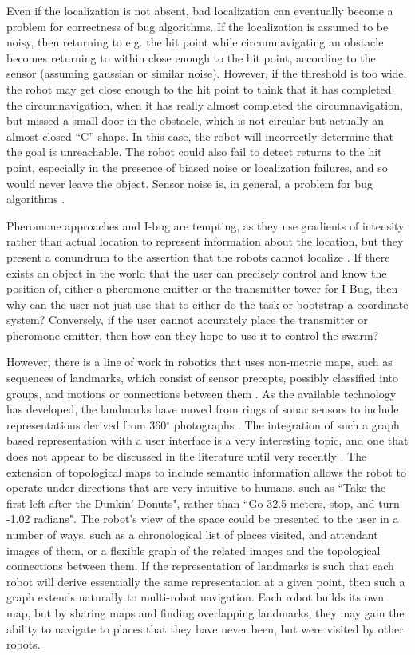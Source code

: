 Even if the localization is not absent, bad localization can eventually become a problem for correctness of bug algorithms. 
If the localization is assumed to be noisy, then returning to e.g. the hit point while circumnavigating an obstacle becomes returning to within close enough to the hit point, according to the sensor (assuming gaussian or similar noise). 
However, if the threshold is too wide, the robot may get close enough to the hit point to think that it has completed the circumnavigation, when it has really almost completed the circumnavigation, but missed a small door in the obstacle, which is not circular but actually an almost-closed ``C'' shape. 
In this case, the robot will incorrectly determine that the goal is unreachable. 
The robot could also fail to detect returns to the hit point, especially in the presence of biased noise or localization failures, and so would never leave the object. 
Sensor noise is, in general, a problem for bug algorithms \cite{ng2007performance}.

Pheromone approaches and I-bug are tempting, as they use gradients of intensity rather than actual location to represent information about the location, but they present a conundrum to the assertion that the robots cannot localize \citep{taylor2009bug}. 
If there exists an object in the world that the user can precisely control and know the position of, either a pheromone emitter or the transmitter tower for I-Bug, then why can the user not just use that to either do the task or bootstrap a coordinate system?
Conversely, if the user cannot accurately place the transmitter or pheromone emitter, then how can they hope to use it to control the swarm? 

However, there is a line of work in robotics that uses non-metric maps, such as sequences of landmarks, which consist of sensor precepts, possibly classified into groups, and motions or connections between them \citep{mataric1991navigating, franz1998learning}. 
As the available technology has developed, the landmarks have moved from rings of sonar sensors to include representations derived from 360$^\circ$ photographs \citep{tapus2005incremental, goedeme2007omnidirectional}. 
The integration of such a graph based representation with a user interface is a very interesting topic, and one that does not appear to be discussed in the literature until very recently \citep{landsiedel2018semantic}. 
The extension of topological maps to include semantic information allows the robot to operate under directions that are very intuitive to humans, such as ``Take the first left after the Dunkin' Donuts", rather than ``Go 32.5 meters, stop, and turn -1.02 radians".
The robot's view of the space could be presented to the user in a number of ways, such as a chronological list of places visited, and attendant images of them, or a flexible graph of the related images and the topological connections between them. 
If the representation of landmarks is such that each robot will derive essentially the same representation at a given point, then such a graph extends naturally to multi-robot navigation. 
Each robot builds its own map, but by sharing maps and finding overlapping landmarks, they may gain the ability to navigate to places that they have never been, but were visited by other robots. 

